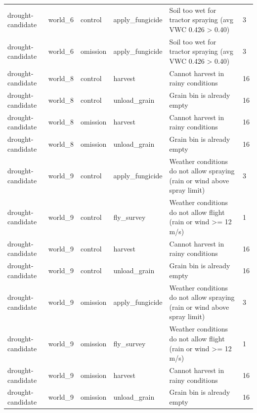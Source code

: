{\begin{tabular}{llllll}
drought-candidate & world\_6 & control & apply\_fungicide & Soil too wet for tractor spraying (avg VWC 0.426 > 0.40) & 3 \\
drought-candidate & world\_6 & omission & apply\_fungicide & Soil too wet for tractor spraying (avg VWC 0.426 > 0.40) & 3 \\
drought-candidate & world\_8 & control & harvest & Cannot harvest in rainy conditions & 16 \\
drought-candidate & world\_8 & control & unload\_grain & Grain bin is already empty & 16 \\
drought-candidate & world\_8 & omission & harvest & Cannot harvest in rainy conditions & 16 \\
drought-candidate & world\_8 & omission & unload\_grain & Grain bin is already empty & 16 \\
drought-candidate & world\_9 & control & apply\_fungicide & Weather conditions do not allow spraying (rain or wind above spray limit) & 3 \\
drought-candidate & world\_9 & control & fly\_survey & Weather conditions do not allow flight (rain or wind >= 12 m/s) & 1 \\
drought-candidate & world\_9 & control & harvest & Cannot harvest in rainy conditions & 16 \\
drought-candidate & world\_9 & control & unload\_grain & Grain bin is already empty & 16 \\
drought-candidate & world\_9 & omission & apply\_fungicide & Weather conditions do not allow spraying (rain or wind above spray limit) & 3 \\
drought-candidate & world\_9 & omission & fly\_survey & Weather conditions do not allow flight (rain or wind >= 12 m/s) & 1 \\
drought-candidate & world\_9 & omission & harvest & Cannot harvest in rainy conditions & 16 \\
drought-candidate & world\_9 & omission & unload\_grain & Grain bin is already empty & 16 \\
\end{tabular}%
}
